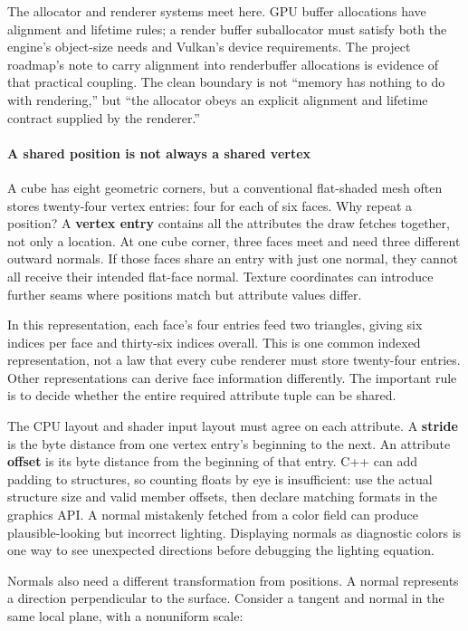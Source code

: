 The allocator and renderer systems meet here. GPU buffer allocations have alignment and lifetime rules; a render buffer suballocator must satisfy both the engine's object-size needs and Vulkan's device requirements. The project roadmap's note to carry alignment into renderbuffer allocations is evidence of that practical coupling. The clean boundary is not ``memory has nothing to do with rendering,'' but ``the allocator obeys an explicit alignment and lifetime contract supplied by the renderer.''

\paragraph{A shared position is not always a shared vertex}\label{a-shared-position-is-not-always-a-shared-vertex}

A cube has eight geometric corners, but a conventional flat-shaded mesh often stores twenty-four vertex entries: four for each of six faces. Why repeat a position? A \textbf{vertex entry} contains all the attributes the draw fetches together, not only a location. At one cube corner, three faces meet and need three different outward normals. If those faces share an entry with just one normal, they cannot all receive their intended flat-face normal. Texture coordinates can introduce further seams where positions match but attribute values differ.

In this representation, each face's four entries feed two triangles, giving six indices per face and thirty-six indices overall. This is one common indexed representation, not a law that every cube renderer must store twenty-four entries. Other representations can derive face information differently. The important rule is to decide whether the entire required attribute tuple can be shared.

The CPU layout and shader input layout must agree on each attribute. A \textbf{stride} is the byte distance from one vertex entry's beginning to the next. An attribute \textbf{offset} is its byte distance from the beginning of that entry. C++ can add padding to structures, so counting floats by eye is insufficient: use the actual structure size and valid member offsets, then declare matching formats in the graphics API. A normal mistakenly fetched from a color field can produce plausible-looking but incorrect lighting. Displaying normals as diagnostic colors is one way to see unexpected directions before debugging the lighting equation.

Normals also need a different transformation from positions. A normal represents a direction perpendicular to the surface. Consider a tangent and normal in the same local plane, with a nonuniform scale:


